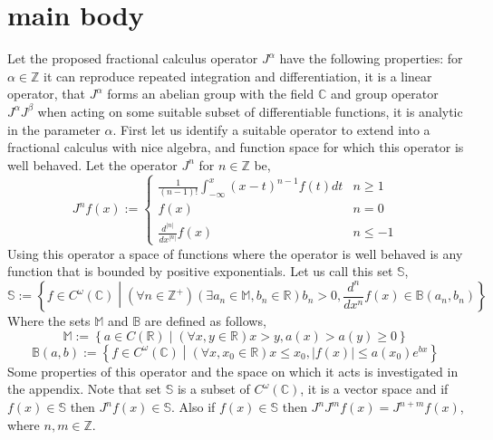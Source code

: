 \documentclass[%
 onecolumn,
 amsmath, amssymb, aps, pra, 10pt
]{revtex4-2}
\begin{document}
\section{main body}
Let the proposed fractional calculus operator $J^\alpha$ have the following properties: for $\alpha \in \mathbb{Z}$ it can reproduce repeated integration and differentiation, it is a linear operator, that $J^\alpha$ forms an abelian group with the field $\mathbb{C}$ and group operator $J^\alpha J^\beta$ when acting on some suitable subset of differentiable functions, it is analytic in the parameter $\alpha$. First let us identify a suitable operator to extend into a fractional calculus with nice algebra, and function space for which this operator is well behaved. Let the operator $J^n$ for $n \in \mathbb{Z}$ be,
\begin{equation}
J^n f(x) := \begin{cases} \frac{1}{(n-1)!}\int_{-\infty}^x (x - t)^{n - 1}f(t)dt & n \geq 1 \\ f(x) & n = 0 \\ \frac{d^{\left|n\right|}}{dx^{\left|n\right|}}f(x) & n \leq -1 \end{cases}
\label{integer_calculus}
\end{equation}
Using this operator a space of functions where the operator is well behaved is any function that is bounded by positive exponentials. Let us call this set $\mathbb{S}$,
\begin{equation}
\mathbb{S} := \left\lbrace f \in C^\omega(\mathbb{C}) \middle| (\forall n \in \mathbb{Z}^+)(\exists a_n \in \mathbb{M}, b_n \in \mathbb{R}) b_n > 0, \frac{d^n}{dx^n}f(x) \in \mathbb{B}(a_n, b_n) \right\rbrace
\label{exponentialy_bounded}
\end{equation}
Where the sets $\mathbb{M}$ and $\mathbb{B}$ are defined as follows,
\[\mathbb{M} := \left\lbrace a \in C(\mathbb{R}) \middle| (\forall x, y \in \mathbb{R}) x > y, a(x) > a(y) \geq 0 \right\rbrace\]
\[\mathbb{B}(a, b) := \left\lbrace f \in C^\omega(\mathbb{C}) \middle| (\forall x, x_0 \in \mathbb{R}) x \leq x_0, |f(x)| \leq a(x_0)e^{bx} \right\rbrace\]
Some properties of this operator and the space on which it acts is investigated in the appendix. Note that set $\mathbb{S}$ is a subset of $C^{\omega}(\mathbb{C})$, it is a vector space and if $f(x) \in \mathbb{S}$ then $J^n f(x) \in \mathbb{S}$. Also if $f(x) \in \mathbb{S}$ then $J^n J^m f(x) = J^{n + m} f(x)$, where $n, m \in \mathbb{Z}$.
\end{document}
